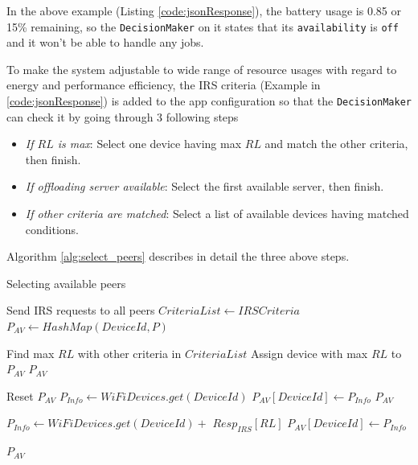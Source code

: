 \documentclass{sig-alternate}[10pt]
\begin{document}
In the above example (Listing \ref{code:jsonResponse}), the battery usage is 0.85 or 15\% remaining, so the \texttt{DecisionMaker} on it states that its \texttt{availability} is \texttt{off} and it won't be able to handle any jobs.

To make the system adjustable to wide range of resource usages with regard to energy and performance efficiency, the IRS criteria (Example in \ref{code:jsonResponse}) is added to the app configuration so that the \texttt{DecisionMaker} can check it by going through 3 following steps
\begin{itemize}
	\item \emph{If $RL$ is max}: Select one device having max $RL$ and match the other criteria, then finish.
	\item \emph{If offloading server available}: Select the first available server, then finish.
	\item \emph{If other criteria are matched}: Select a list of available devices having matched conditions.
\end{itemize}
Algorithm \ref{alg:select_peers} describes in detail the three above steps.

\begin{algorithm}

\caption{Selecting available peers}
\label{alg:select_peers}
\begin{algorithmic}[1] 
\begin{scriptsize}
\State Send IRS requests to all peers 
\State $CriteriaList \leftarrow IRSCriteria$
\State $P_{AV} \leftarrow HashMap(DeviceId, P)$

  	\State Find max $RL$ with other criteria in $CriteriaList$
		\State Assign device with max $RL$ to $P_{AV}$
  	\State \Return $P_{AV}$
  \EndFor
\EndIf

  	\State Reset $P_{AV}$ 
  	\State $P_{Info} \leftarrow WiFiDevices.get(DeviceId)$
  	\State $P_{AV}[DeviceId] \leftarrow P_{Info}$
  	\State \Return $P_{AV}$
  \EndIf

  	\State $P_{Info} \leftarrow WiFiDevices.get(DeviceId) + $
		\State
			\hspace{\algorithmicindent}
			\hspace{\algorithmicindent}
			\hspace{\algorithmicindent}
			\hspace{\algorithmicindent}
			$Resp_{IRS}[RL]$
  	\State $P_{AV}[DeviceId] \leftarrow P_{Info}$
  \EndIf
\EndFor

\State \Return $P_{AV}$
\EndFunction
\end{scriptsize}
\end{algorithmic}

\end{algorithm}
\end{document}
